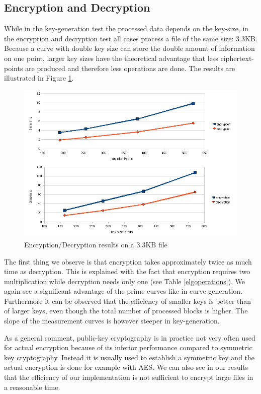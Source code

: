 \documentclass[11pt,english]{article}
\begin{document}
\subsection{Encryption and Decryption}
While in the key-generation test the processed data depends on the key-size, in the encryption and decryption test all cases process a file of the same size: 3.3KB. Because a curve with double key size can store the double amount of information on one point, larger key sizes have the theoretical advantage that less ciphertext-points are produced and therefore less operations are done. The results are illustrated in Figure \ref{figure:encdec}.

\label{encdecres}
\begin{figure}[h]
\centering
\includegraphics[scale=0.6]{dia2.png}
\caption{Encryption/Decryption results on a 3.3KB file}
\label{figure:encdec}
\end{figure}

The first thing we observe is that encryption takes approximately twice as much time as decryption. This is explained with the fact that encryption requires two multiplication while decryption needs only one (see Table \ref{elgoperations}). We again see a significant advantage of the prime curves like in curve generation. Furthermore it can be observed that the efficiency of smaller keys is better than of larger keys, even though the total number of processed blocks is higher. The slope of the measurement curves is however steeper in key-generation.

As a general comment, public-key cryptography is in practice not very often used for actual encryption because of its inferior performance compared to symmetric key cryptography. Instead it is usually used to establish a symmetric key and the actual encryption is done for example with AES. We can also see in our results that the efficiency of our implementation is not sufficient to encrypt large files in a reasonable time.
\end{document}
